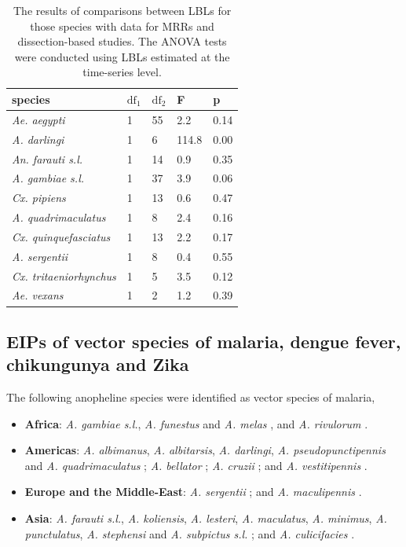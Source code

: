 \documentclass[12pt]{article}
\begin{document}
{\begin{table}[htbp]
	\centering
	\begin{tabular}{l|l|l|l|l}
		species & \multicolumn{1}{l}{$\text{df}_1$} & \multicolumn{1}{l}{$\text{df}_2$} & \multicolumn{1}{l}{F} & \multicolumn{1}{l}{p} \\
		\midrule
		\textit{Ae. aegypti} & 1     & 55    & 2.2   & 0.14 \\
		\textit{A. darlingi} & 1     & 6     & 114.8   & 0.00 \\
		\textit{An. farauti s.l.} & 1     & 14    & 0.9  & 0.35 \\
		\textit{A. gambiae s.l.} & 1     & 37    & 3.9   & 0.06 \\
		\textit{Cx. pipiens} & 1     & 13    & 0.6   & 0.47 \\
		\textit{A. quadrimaculatus} & 1     & 8     & 2.4     & 0.16 \\
		\textit{Cx. quinquefasciatus} & 1     & 13    & 2.2    & 0.17 \\
		\textit{A. sergentii} & 1     & 8     & 0.4     & 0.55 \\
		\textit{Cx. tritaeniorhynchus} & 1     & 5     & 3.5   & 0.12 \\
		\textit{Ae. vexans} & 1     & 2     & 1.2   & 0.39 \\
	\end{tabular}%
	\caption{The results of comparisons between LBLs for those species with data for MRRs and dissection-based studies. The ANOVA tests were conducted using LBLs estimated at the time-series level.}
	\label{tab:comparison}%
\end{table}%

\subsection{EIPs of vector species of malaria, dengue fever, chikungunya and Zika}
The following anopheline species were identified as vector species of malaria,

\begin{itemize}
	\item \textbf{Africa}: \textit{A. gambiae s.l.}, \textit{A. funestus} and \textit{A. melas} \citep{sinka2012global}, and \textit{A. rivulorum} \citep{wilkes1996anopheles}.
	\item \textbf{Americas}: \textit{A. albimanus}, \textit{A. albitarsis}, \textit{A. darlingi}, \textit{A. pseudopunctipennis} and \textit{A. quadrimaculatus} \citep{sinka2012global}; \textit{A. bellator}  \citep{forattini1999role,lorenz2012morphometrical}; \textit{A. cruzii} \citep{lorenz2012morphometrical}; and \textit{A. vestitipennis} \citep{sinka2010dominant}.
	\item \textbf{Europe and the Middle-East}: \textit{A. sergentii} \citep{sinka2012global}; and \textit{A. maculipennis} \citep{hackett1935varieties}.
	\item \textbf{Asia}: \textit{A. farauti s.l.}, \textit{A. koliensis}, \textit{A. lesteri}, \textit{A. maculatus}, \textit{A. minimus}, \textit{A. punctulatus}, \textit{A. stephensi} and \textit{A. subpictus s.l.} \citep{sinka2012global}; and \textit{A. culicifacies} \citep{green1980chromosomal}.
\end{itemize}

}
\end{document}
